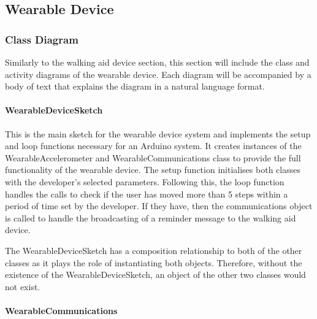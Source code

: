         \subsection{Wearable Device}
        \label{subsec:wearable_device_uml}

            \subsubsection{Class Diagram}
            \label{subsubsec:class_diagram_wearable}

                Similarly to the walking aid device section, this section will include the class and activity diagrams of the wearable device. Each diagram will be accompanied by a body of text that explains the diagram in a natural language format.

                \clearpage
                \thispagestyle{empty}
                \begin{landscape}
                    
                \end{landscape}

                \paragraph{WearableDeviceSketch}\mbox{}

                    This is the main sketch for the wearable device system and implements the setup and loop functions necessary for an Arduino system. It creates instances of the WearableAccelerometer and WearableCommunications class to provide the full functionality of the wearable device. The setup function initialises both classes with the developer's selected parameters. Following this, the loop function handles the calls to check if the user has moved more than 5 steps within a period of time set by the developer. If they have, then the communications object is called to handle the broadcasting of a reminder message to the walking aid device.

                    The WearableDeviceSketch has a composition relationship to both of the other classes as it plays the role of instantiating both objects. Therefore, without the existence of the WearableDeviceSketch, an object of the other two classes would not exist.

                \paragraph{WearableCommunications}\mbox{}

